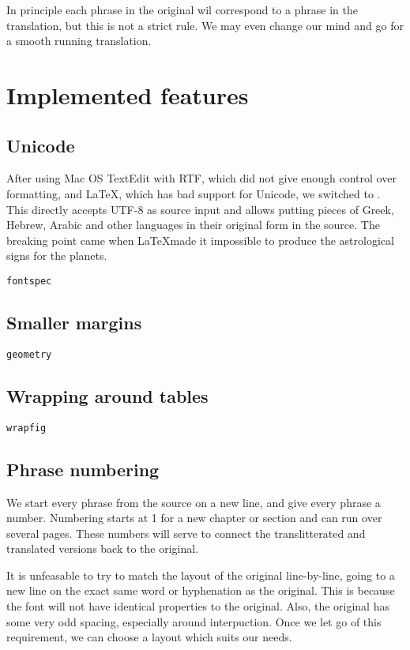 \documentclass[12pt]{report}
\begin{document}
In principle each phrase in the original wil correspond to a phrase in the translation, but this is not a strict rule.
We may even change our mind and go for a smooth running translation.

\chapter{Implemented features}
\section{Unicode}
After using Mac OS TextEdit with RTF, which did not give enough control over formatting, and \LaTeX{}, which
has bad support for Unicode, we switched to \XeLaTeX{}. This directly accepts UTF-8 as source input and allows
putting pieces of Greek, Hebrew, Arabic and other languages in their original form in the source. The breaking point
came when \LaTeX made it impossible to produce the astrological signs for the planets.

\texttt{fontspec}

\section{Smaller margins}
\texttt{geometry}

\section{Wrapping around tables}
\texttt{wrapfig}

\section{Phrase numbering}
We start every phrase from the source on a new line, and give every phrase a number. Numbering starts at 1 for
a new chapter or section and can run over several pages. These numbers will serve to connect the translitterated
and translated versions back to the original.

It is unfeasable to try to match the layout of the original line-by-line, going to a new line on the exact same word
or hyphenation as the original. This is because the font will not have identical properties to the original. Also,
the original has some very odd spacing, especially around interpuction. Once we let go of this requirement, we can
choose a layout which suits our needs.
\end{document}
